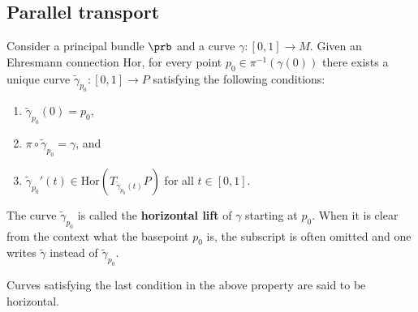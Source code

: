\subsection{Parallel transport}

    \begin{definition}
        Consider a principal bundle $\prb$ and a curve $\gamma:[0,1]\rightarrow M$. Given an Ehresmann connection $\text{Hor}$, for every point $p_0\in \pi^{-1}(\gamma(0))$ there exists a unique curve $\widetilde{\gamma}_{p_0}:[0,1]\rightarrow P$ satisfying the following conditions:
        \begin{enumerate}
            \item $\widetilde{\gamma}_{p_0}(0) = p_0$,
            \item $\pi\circ\widetilde{\gamma}_{p_0} = \gamma$, and
            \item $\widetilde{\gamma}_{p_0}'(t)\in\text{Hor}(T_{\widetilde{\gamma}_{p_0}(t)}P)$ for all $t\in[0,1]$.
        \end{enumerate}
        The curve $\widetilde{\gamma}_{p_0}$ is called the \textbf{horizontal lift} of $\gamma$ starting at $p_0$. When it is clear from the context what the basepoint $p_0$ is, the subscript is often omitted and one writes $\widetilde{\gamma}$ instead of $\widetilde{\gamma}_{p_0}$.
    \end{definition}
    \begin{remark}
        Curves satisfying the last condition in the above property are said to be horizontal.
    \end{remark}

